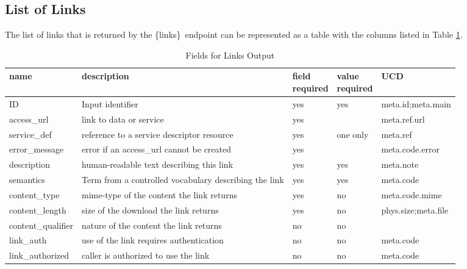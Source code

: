 \documentclass[11pt,a4paper]{ivoa}
\newcommand{\blinks}{\{links\}}
\begin{document}
\subsection{List of Links}
\label{sec:listOfLinks}

The list of links that is returned by the \blinks\ endpoint can be
represented as a table with the columns listed in Table \ref{fig:linkFields}. 
\begin{table}[h]
\begin{center}
\begin{tabular}{|l|p{}|p{}|p{}|l|}
\hline
{\bf name}      & {\bf description} & {\bf field \newline required}
                & {\bf value \newline required} & {\bf UCD} \\
\hline
ID              & Input identifier & yes & yes & meta.id;meta.main \\
\hline
access\_url     & link to data or service 
                & yes &          & meta.ref.url \\
\cline{1-3} \cline{5-5}
service\_def    & reference to a service descriptor resource
                & yes & one only & meta.ref \\
\cline{1-3} \cline{5-5}
error\_message  & error if an access\_url cannot be created
                & yes &          & meta.code.error \\
\hline
description     & human-readable text describing this link
                & yes & yes & meta.note \\
\hline
semantics       & Term from a controlled vocabulary describing the link
                & yes & yes & meta.code \\
\hline
content\_type   & mime-type of the content the link returns
                & yes & no & meta.code.mime \\
\hline
content\_length & size of the download the link returns
                & yes & no & phys.size;meta.file \\
\hline
content\_qualifier & nature of the content the link returns
                & no & no & \\
\hline
link\_auth       & use of the link requires authentication
                 & no & no & meta.code \\
\hline
link\_authorized & caller is authorized to use the link
                 & no & no & meta.code \\
\hline
\end{tabular}
\end{center}
\caption{Fields for Links Output}
\label{fig:linkFields}
\end{table}
\end{document}
